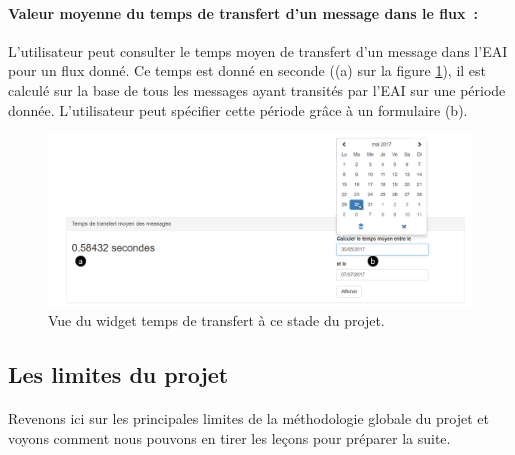 			\paragraph{Valeur moyenne du temps de transfert d'un message dans le flux~: }
			L'utilisateur peut consulter le temps moyen de transfert d'un message dans
			l'EAI pour un flux donné. Ce temps est donné en seconde ((a) sur la figure
			\ref{vue_transfer}), il est calculé sur la base de tous les messages ayant
			transités par l'EAI sur une période donnée. L'utilisateur peut spécifier
			cette période grâce à un formulaire (b).
			\begin{figure}[H]
				\centering
				\includegraphics[width=16cm]{../img/part3/vue_transfer.png}
				\caption{\label{vue_transfer} Vue du widget temps de transfert à ce stade
				du projet.}
			\end{figure}
		
		\subsection{Les limites du projet}
			\paragraph{}%
			Revenons ici sur les principales limites de la méthodologie globale du
			projet et voyons comment nous pouvons en tirer
			les leçons pour préparer la suite.
		
